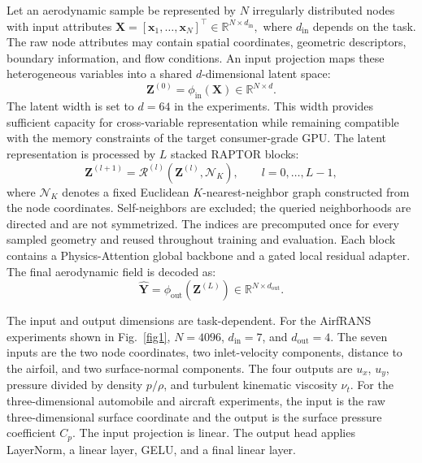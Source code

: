 \documentclass[a4paper,fleqn]{cas-sc}
\begin{document}
Let an aerodynamic sample be represented by \(N\) irregularly distributed nodes with input attributes $ \mathbf{X}=[\mathbf{x}_1,\ldots,\mathbf{x}_N]^{\top}    \in\mathbb{R}^{N\times d_{\mathrm{in}}},$ where \(d_{\mathrm{in}}\) depends on the task. The raw node attributes may contain spatial coordinates, geometric descriptors, boundary information, and flow conditions. An input projection maps these heterogeneous variables into a shared \(d\)-dimensional latent space:
\begin{equation}
    \mathbf{Z}^{(0)} = \phi_{\mathrm{in}}(\mathbf{X})\in\mathbb{R}^{N\times d}.
    \label{eq:input_projection}
\end{equation}
The latent width is set to \(d=64\) in the experiments. This width provides sufficient capacity for cross-variable representation while remaining compatible with the memory constraints of the target consumer-grade GPU. The latent representation is processed by \(L\) stacked RAPTOR blocks:
\begin{equation}
    \mathbf{Z}^{(l+1)}  = \mathcal{R}^{(l)}  \left( \mathbf{Z}^{(l)},\mathcal{N}_K \right),
    \qquad l=0,\ldots,L-1,
    \label{eq:stacked_raptor}
\end{equation}
where \(\mathcal{N}_K\) denotes a fixed Euclidean \(K\)-nearest-neighbor graph constructed from the node coordinates. Self-neighbors are excluded; the queried neighborhoods are directed and are not symmetrized. The indices are precomputed once for every sampled geometry and reused throughout training and evaluation. Each block contains a Physics-Attention global backbone and a gated local residual adapter.
The final aerodynamic field is decoded as:
\begin{equation}
    \widehat{\mathbf{Y}}
    =
    \phi_{\mathrm{out}}
    \left(
        \mathbf{Z}^{(L)}
    \right)
    \in\mathbb{R}^{N\times d_{\mathrm{out}}}.
    \label{eq:output_projection}
\end{equation}

The input and output dimensions are task-dependent. For the AirfRANS experiments shown in Fig.~\ref{fig1}, \(N=4096\), \(d_{\mathrm{in}}=7\), and \(d_{\mathrm{out}}=4\). The seven inputs are the two node coordinates, two inlet-velocity components, distance to the airfoil, and two surface-normal components. The four outputs are \(u_x\), \(u_y\), pressure divided by density \(p/\rho\), and turbulent kinematic viscosity \(\nu_t\). For the three-dimensional automobile and aircraft experiments, the input is the raw three-dimensional surface coordinate and the output is the surface pressure coefficient \(C_p\). The input projection is linear. The output head applies LayerNorm, a linear layer, GELU, and a final linear layer.
\end{document}
